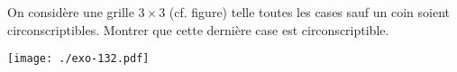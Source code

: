 On considère une grille $3\times 3$ (cf. figure) telle toutes les cases sauf un coin soient circonscriptibles. Montrer que cette dernière case est circonscriptible.
\begin{center}
\texttt{[image: ./exo-132.pdf]}
\end{center}